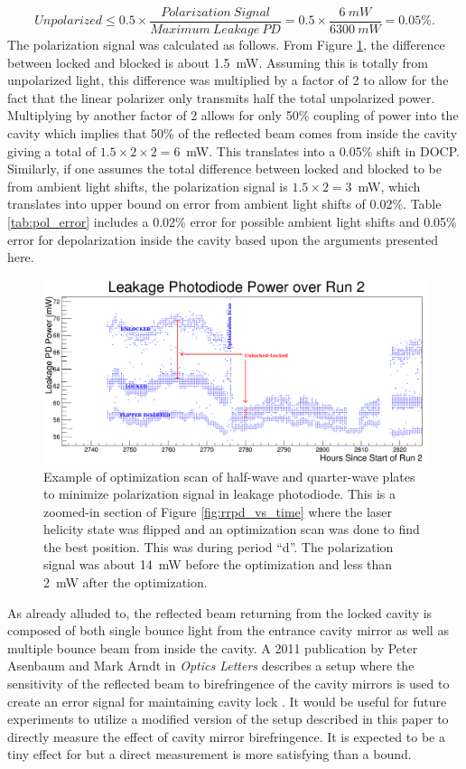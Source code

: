 \[
Unpolarized \leq0.5\times\frac{Polarization~Signal}{Maximum~Leakage~PD}=0.5\times\frac{6~mW}{6300~mW}=0.05\%.
\]
The polarization signal was calculated as follows. From Figure \ref{fig:LCPandRCP}, the difference between locked and blocked is about 1.5~mW. Assuming this is totally from unpolarized light, this difference was multiplied by a factor of 2 to allow for the fact that the linear polarizer only transmits half the total unpolarized power. Multiplying by another factor of 2 allows for only 50\% coupling of power into the cavity which implies that 50\% of the reflected beam comes from inside the cavity giving a total of $1.5\times2\times2=6$~mW. This translates into a 0.05\% shift in DOCP. Similarly, if one assumes the total difference between locked and blocked to be from ambient light shifts, the polarization signal is $1.5\times2=3$~mW, which translates into upper bound on error from ambient light shifts of 0.02\%. Table \ref{tab:pol_error} includes a 0.02\% error for possible ambient light shifts and 0.05\% error for depolarization inside the cavity based upon the arguments presented here. 
 
\begin{figure}[!!!!ht]
\begin{center}
\includegraphics[width=5.5in]{./Pictures/LCPandRCP.png}
\caption{\label{fig:LCPandRCP}Example of optimization scan of half-wave and quarter-wave plates to minimize polarization signal in leakage photodiode. This is a zoomed-in section of Figure \ref{fig:rrpd_vs_time} where the laser helicity state was flipped and an optimization scan was done to find the best position. This was during period ``d''. The polarization signal was about 14~mW before the optimization and less than 2~mW after the optimization.}
\end{center}
\end{figure}


As already alluded to, the reflected beam returning from the locked cavity is composed of both single bounce light from the entrance cavity mirror as well as multiple bounce beam from inside the cavity. A 2011 publication by Peter Asenbaum and Mark Arndt in {\it Optics Letters} describes a setup where the sensitivity of the reflected beam to birefringence of the cavity mirrors is used to create an error signal for maintaining cavity lock \cite{Asenbaum}. It would be useful for future experiments to utilize a modified version of the setup described in this paper to directly measure the effect of cavity mirror birefringence. It is expected to be a tiny effect for \Qs but a direct measurement is more satisfying than a bound.  

